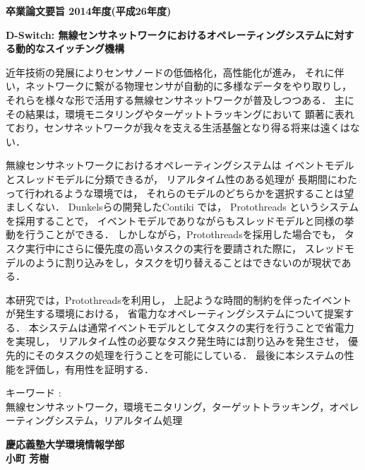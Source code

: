 \begin{center}
\textbf{\Large 卒業論文要旨 2014年度(平成26年度)}

\vspace{6.18mm}

\textbf{\Large D-Switch: 無線センサネットワークにおけるオペレーティングシステムに対する動的なスイッチング機構}
\end{center}

\vspace{10mm}
近年技術の発展によりセンサノードの低価格化，高性能化が進み，
それに伴い，ネットワークに繋がる物理センサが自動的に多様なデータをやり取りし，
それらを様々な形で活用する無線センサネットワークが普及しつつある．
主にその結果は，環境モニタリングやターゲットトラッキングにおいて
顕著に表れており，センサネットワークが我々を支える生活基盤となり得る将来は遠くはない．

無線センサネットワークにおけるオペレーティングシステムは
イベントモデルとスレッドモデルに分類できるが，
リアルタイム性のある処理が
長期間にわたって行われるような環境では，
それらのモデルのどちらかを選択することは望ましくない．
Dunkelsらの開発したContiki\cite{Dunkels:2004:CLF:1032658.1034117}
では，
Protothreads\cite{Dunkels:2006:PSE:1182807.1182811}
というシステムを採用することで，
イベントモデルでありながらもスレッドモデルと同様の挙動を行うことができる．
しかしながら，Protothreadsを採用した場合でも，
タスク実行中にさらに優先度の高いタスクの実行を要請された際に，
スレッドモデルのように割り込みをし，タスクを切り替えることはできないのが現状である．

本研究では，Protothreadsを利用し，
上記ような時間的制約を伴ったイベントが発生する環境における，
省電力なオペレーティングシステムについて提案する．
本システムは通常イベントモデルとしてタスクの実行を行うことで省電力を実現し，
リアルタイム性の必要なタスク発生時には割り込みを発生させ，
優先的にそのタスクの処理を行うことを可能にしている．
最後に本システムの性能を評価し，有用性を証明する．


\vspace{10mm}
キーワード :\\
\hspace{3.5em}無線センサネットワーク，環境モニタリング，ターゲットトラッキング，オペレーティングシステム，リアルタイム処理

\begin{flushright}
\textbf{慶応義塾大学環境情報学部}\\
\textbf{小町 芳樹}
\end{flushright}

